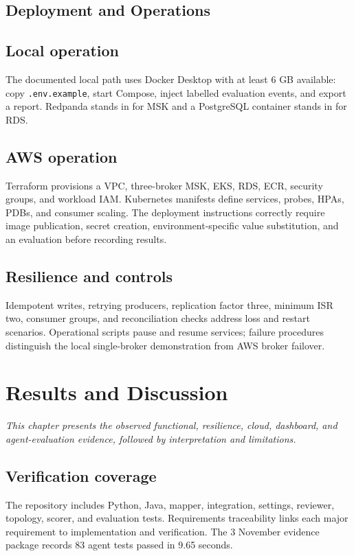 \documentclass[12pt,oneside]{report}
\begin{document}
\section{Deployment and Operations}
\section{Local operation}
The documented local path uses Docker Desktop with at least 6 GB available: copy \texttt{.env.example}, start Compose, inject labelled evaluation events, and export a report. Redpanda stands in for MSK and a PostgreSQL container stands in for RDS.
\section{AWS operation}
Terraform provisions a VPC, three-broker MSK, EKS, RDS, ECR, security groups, and workload IAM. Kubernetes manifests define services, probes, HPAs, PDBs, and consumer scaling. The deployment instructions correctly require image publication, secret creation, environment-specific value substitution, and an evaluation before recording results.
\section{Resilience and controls}
Idempotent writes, retrying producers, replication factor three, minimum ISR two, consumer groups, and reconciliation checks address loss and restart scenarios. Operational scripts pause and resume services; failure procedures distinguish the local single-broker demonstration from AWS broker failover.

\chapter{Results and Discussion}
\noindent\textit{This chapter presents the observed functional, resilience, cloud, dashboard, and agent-evaluation evidence, followed by interpretation and limitations.}\par
\section{Verification coverage}
The repository includes Python, Java, mapper, integration, settings, reviewer, topology, scorer, and evaluation tests. Requirements traceability links each major requirement to implementation and verification. The 3 November evidence package records 83 agent tests passed in 9.65 seconds.
\end{document}
